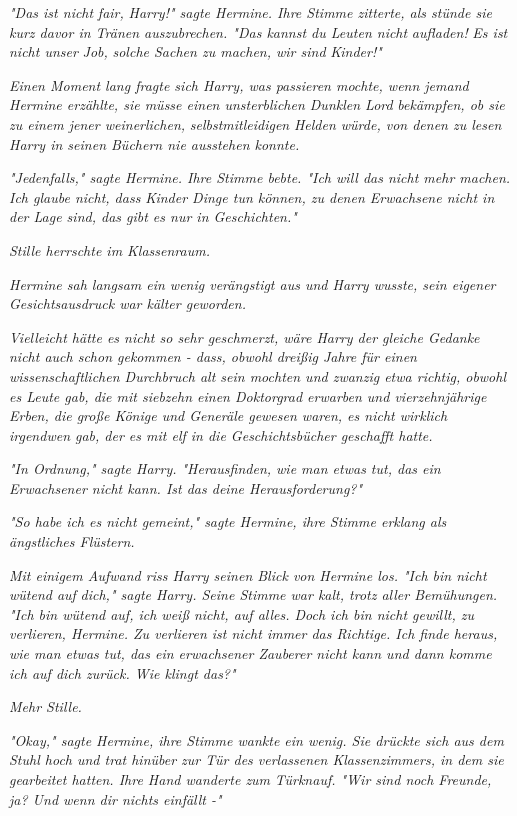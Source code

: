 {\emph{"Das ist nicht} \emph{\emph{fair,}} \emph{Harry!" sagte Hermine. Ihre Stimme zitterte, als stünde sie kurz davor in Tränen auszubrechen. "Das kannst du Leuten nicht} \emph{\emph{aufladen!}} \emph{Es ist nicht unser} \emph{\emph{Job,}} \emph{solche Sachen zu machen, wir sind} \emph{\emph{Kinder!}"}

\emph{Einen Moment lang fragte sich Harry, was passieren mochte, wenn jemand Hermine erzählte, sie müsse einen unsterblichen Dunklen Lord} \emph{bekämpfen, ob sie zu einem jener weinerlichen,} \emph{selbstmitleidigen} \emph{Helden würde, von denen zu lesen Harry in seinen Büchern nie ausstehen konnte.}

\emph{"Jedenfalls," sagte Hermine. Ihre Stimme bebte. "Ich will das nicht mehr machen. Ich glaube nicht, dass Kinder Dinge tun können, zu denen Erwachsene nicht in der Lage sind, das gibt es nur in Geschichten."}

\emph{Stille herrschte im Klassenraum.}

\emph{Hermine sah langsam ein wenig verängstigt aus und Harry wusste, sein eigener Gesichtsausdruck war kälter geworden.}

\emph{Vielleicht hätte es nicht so sehr geschmerzt, wäre Harry der gleiche Gedanke nicht auch schon gekommen - dass, obwohl dreißig Jahre für einen wissenschaftlichen Durchbruch alt sein mochten und zwanzig etwa richtig, obwohl es Leute gab, die mit siebzehn einen Doktorgrad erwarben und vierzehnjährige Erben, die große Könige und Generäle gewesen waren, es nicht wirklich irgendwen gab, der es mit elf in die Geschichtsbücher geschafft hatte.}

\emph{"In Ordnung," sagte Harry. "Herausfinden, wie man etwas tut, das ein Erwachsener nicht kann. Ist das deine Herausforderung?"}

\emph{"So habe ich es nicht gemeint," sagte Hermine, ihre Stimme erklang als ängstliches Flüstern.}

\emph{Mit einigem Aufwand riss Harry seinen Blick von Hermine los. "Ich bin nicht wütend auf} \emph{\emph{dich,}" sagte Harry. Seine Stimme war kalt, trotz aller Bemühungen. "Ich bin wütend auf, ich weiß nicht, auf alles. Doch ich bin nicht gewillt, zu verlieren, Hermine. Zu verlieren ist nicht immer das Richtige. Ich finde heraus, wie man etwas tut, das ein erwachsener Zauberer nicht kann und dann komme ich auf dich zurück. Wie klingt das?"}

\emph{Mehr Stille.}

\emph{"Okay," sagte Hermine, ihre Stimme wankte ein wenig. Sie drückte sich aus dem Stuhl hoch und trat hinüber zur Tür des verlassenen Klassenzimmers, in dem sie gearbeitet hatten. Ihre Hand wanderte zum} \emph{Türknauf. "Wir sind noch Freunde, ja? Und wenn dir nichts einfällt -"}

}
